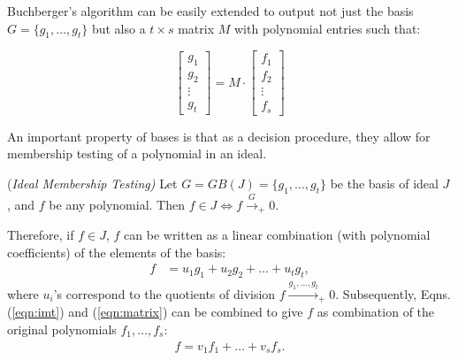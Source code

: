 
Buchberger's algorithm can be easily extended to output 
not just the \Grobner basis $G=\{g_1,\dots,g_t\}$ but also a $t\times
s$ matrix $M$ with polynomial entries such that:

\begin{equation}\label{eqn:matrix}
\begin{bmatrix} g_1 \\ g_2 \\ \vdots \\ g_t \end{bmatrix}  =  M \cdot
\begin{bmatrix} f_1 \\ f_2 \\ \vdots \\ f_s \end{bmatrix}
\end{equation}

An important property of \Grobner bases is that as a decision
procedure, they allow for membership testing of a polynomial in an
ideal. 

\begin{Proposition}
\label{prop:imt}
({\it Ideal Membership Testing)
} 
Let $G = GB(J) = \{g_1,\dots,g_t\}$ be the \Grobner basis of ideal
$J$, and $f$ be any polynomial. Then $f\in J \iff f\xrightarrow{G}_+0$.
\end{Proposition}

Therefore, if $f\in J$, $f$ can
be written as a linear combination (with polynomial coefficients) of
the elements of the \Grobner basis: 
\vspace{-0.1in}
\begin{align}\label{eqn:imt}
f & = u_1g_1 + u_2g_2+ \dots+ u_tg_t,
\end{align}
where $u_i$'s correspond to the quotients of division
$f\xrightarrow{g_1,\dots,g_t}_+0$. Subsequently, Eqns. (\ref{eqn:imt})
and (\ref{eqn:matrix}) can be combined to give $f$ as combination of
the original polynomials $f_1,\dots,f_s$:
\begin{align}\label{eqn:imt_orig}
f = v_1f_1 +\dots+v_sf_s.
\end{align}

